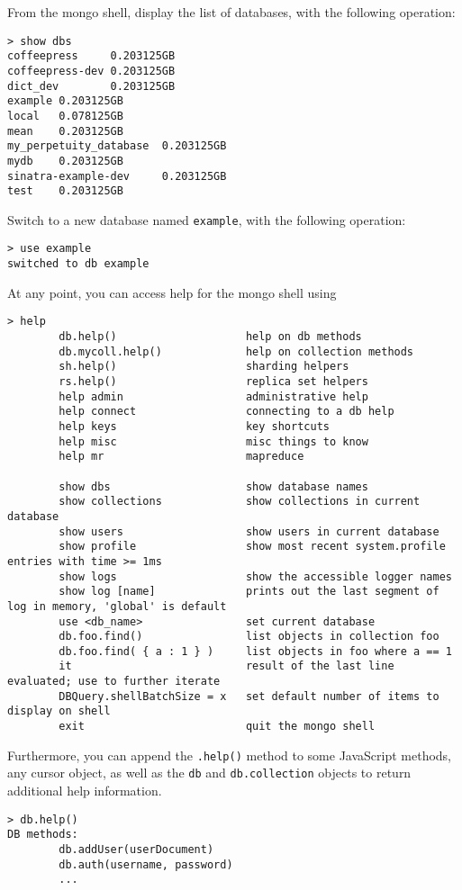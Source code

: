 From the mongo shell, display the list of databases, with the following operation:

\begin{verbatim}
> show dbs
coffeepress     0.203125GB
coffeepress-dev 0.203125GB
dict_dev        0.203125GB
example 0.203125GB
local   0.078125GB
mean    0.203125GB
my_perpetuity_database  0.203125GB
mydb    0.203125GB
sinatra-example-dev     0.203125GB
test    0.203125GB
\end{verbatim}

Switch to a new database named \verb|example|, 
with the following operation:
\begin{verbatim}
> use example
switched to db example
\end{verbatim}
At any point, you can access help for the mongo shell using
\begin{verbatim}
> help
        db.help()                    help on db methods
        db.mycoll.help()             help on collection methods
        sh.help()                    sharding helpers
        rs.help()                    replica set helpers
        help admin                   administrative help
        help connect                 connecting to a db help
        help keys                    key shortcuts
        help misc                    misc things to know
        help mr                      mapreduce

        show dbs                     show database names
        show collections             show collections in current database
        show users                   show users in current database
        show profile                 show most recent system.profile entries with time >= 1ms
        show logs                    show the accessible logger names
        show log [name]              prints out the last segment of log in memory, 'global' is default
        use <db_name>                set current database
        db.foo.find()                list objects in collection foo
        db.foo.find( { a : 1 } )     list objects in foo where a == 1
        it                           result of the last line evaluated; use to further iterate
        DBQuery.shellBatchSize = x   set default number of items to display on shell
        exit                         quit the mongo shell
\end{verbatim}

Furthermore, you can append the \verb|.help()| 
method to some JavaScript methods, any cursor object,
as well as the \verb|db| and \verb|db.collection| objects to return additional help information.
\begin{verbatim}
> db.help()
DB methods:
        db.addUser(userDocument)
        db.auth(username, password)
        ...
\end{verbatim}


